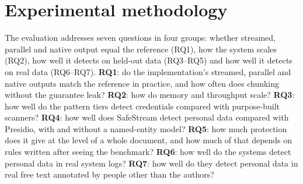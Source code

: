\documentclass[pdflatex,sn-mathphys-num]{sn-jnl}
\theoremstyle{\ssThmStyle}
\theoremstyle{\ssDefStyle}
\begin{document}
\section{Experimental methodology}\label{sec:setup}

The evaluation addresses seven questions in four groups: whether streamed, parallel and native output equal the reference (RQ1), how the system scales (RQ2), how well it detects on held-out data (RQ3--RQ5) and how well it detects on real data (RQ6--RQ7). \textbf{RQ1}: do the implementation's streamed, parallel and native outputs match the reference in practice, and how often does chunking without the guarantee leak? \textbf{RQ2}: how do memory and throughput scale? \textbf{RQ3}: how well do the pattern tiers detect credentials compared with purpose-built scanners? \textbf{RQ4}: how well does SafeStream detect personal data compared with Presidio, with and without a named-entity model? \textbf{RQ5}: how much protection does it give at the level of a whole document, and how much of that depends on rules written after seeing the benchmark? \textbf{RQ6}: how well do the systems detect personal data in real system logs? \textbf{RQ7}: how well do they detect personal data in real free text annotated by people other than the authors?
\end{document}
